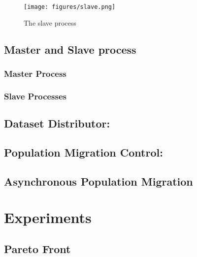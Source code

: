 \documentclass[conference]{IEEEtran}
\begin{document}
  \begin{figure}[H]
    \centering
    \texttt{[image: figures/slave.png]}
    \caption{The slave process}
    \label{fig:slave}
  \end{figure}
  
  \subsection{Master and Slave process}
  \subsubsection{Master Process}
  
  \subsubsection{Slave Processes}\mbox{}
  
	\subsection{Dataset Distributor:}
	
  \subsection{Population Migration Control:}
  
	
  \subsection{Asynchronous Population Migration}
  
  
  \section{Experiments}

  \subsection{Pareto Front}
\end{document}
